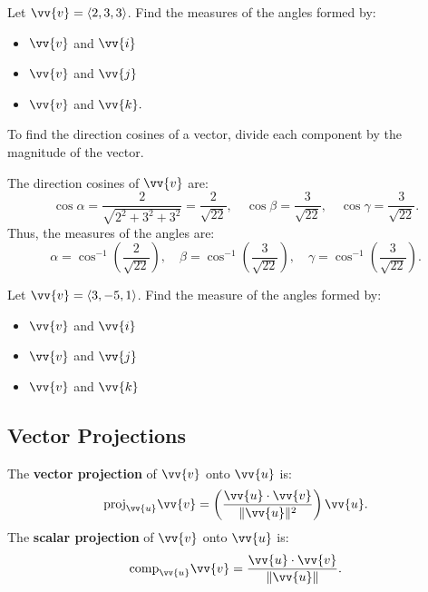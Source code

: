 \documentclass{article}
\begin{document}
\begin{examplebox}
    Let \(\vv{v} = \langle 2, 3, 3 \rangle\). Find the measures of the angles formed by:
    \begin{itemize}
        \item \(\vv{v}\) and \(\vv{i}\)
        \item \(\vv{v}\) and \(\vv{j}\)
        \item \(\vv{v}\) and \(\vv{k}.\)
    \end{itemize}

    \begin{solutionbox}
        \begin{conceptbox}
        To find the direction cosines of a vector, divide each component by the magnitude of the vector.
        \end{conceptbox}

        The direction cosines of \(\vv{v}\) are:
        \[
        \cos \alpha = \frac{2}{\sqrt{2^2 + 3^2 + 3^2}} = \frac{2}{\sqrt{22}}, \quad \cos \beta = \frac{3}{\sqrt{22}}, \quad \cos \gamma = \frac{3}{\sqrt{22}}.
        \]
        Thus, the measures of the angles are:
        \[
        \alpha = \cos^{-1} \left( \frac{2}{\sqrt{22}} \right), \quad \beta = \cos^{-1} \left( \frac{3}{\sqrt{22}} \right), \quad \gamma = \cos^{-1} \left( \frac{3}{\sqrt{22}} \right).
        \]

    \end{solutionbox}
\end{examplebox}

\begin{exercisebox}
    Let \(\vv{v} = \langle 3, -5, 1 \rangle\). Find the measure of the angles formed by:
    \begin{itemize}
        \item \(\vv{v}\) and \(\vv{i}\)
        \item \(\vv{v}\) and \(\vv{j}\)
        \item \(\vv{v}\) and \(\vv{k}\)
    \end{itemize}
\end{exercisebox}

\subsection*{Vector Projections}

The \textbf{vector projection} of \(\vv{v}\) onto \(\vv{u}\) is:
\[
\text{proj}_{\vv{u}} \vv{v} = \left( \frac{\vv{u} \cdot \vv{v}}{\|\vv{u}\|^2} \right) \vv{u}.
\]
The \textbf{scalar projection} of \(\vv{v}\) onto \(\vv{u}\) is:
\[
\text{comp}_{\vv{u}} \vv{v} = \frac{\vv{u} \cdot \vv{v}}{\|\vv{u}\|}.
\]
\end{document}
